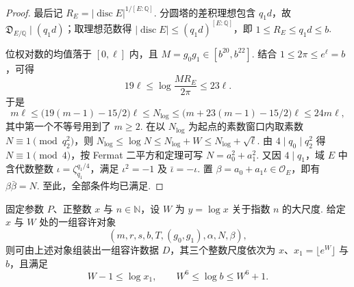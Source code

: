 \begin{proof}
最后记 $R_E=|\operatorname{disc}E|^{1/[E:\mathbb Q]}$. 分圆塔的差积理想包含 $q_1d$，故
$\mathfrak D_{E/\mathbb Q}\mid(q_1d)$；取理想范数得 $|\operatorname{disc}E|\le(q_1d)^{[E:\mathbb Q]}$，即 $1\le R_E\le q_1d\le b$.

位权对数的均值落于 $[0,\ell]$ 内，且 $M=g_0g_1\in[b^{20},b^{22}]$. 结合 $1\le2\pi\le e^\ell=b$，可得
\[
 19\ell\le\log\frac{MR_E}{2\pi}\le23\ell .
\]
于是
\[
 m\ell\le \bigl(19(m-1)-15/2\bigr)\ell
 \le N_{\log}
 \le \bigl(m+23(m-1)-15/2\bigr)\ell\le24m\ell ,
\]
其中第一个不等号用到了 $m\ge2$. 在以 $N_{\log}$ 为起点的素数窗口内取素数 $N\equiv1\pmod{q_2^2}$，则
$N_{\log}\le\log N\le N_{\log}+W\le N_{\log}+\sqrt \ell$.
由 $4\mid q_0\mid q_2^2$ 得 $N\equiv1\pmod4$，按 Fermat 二平方和定理可写
$N=a_0^2+a_1^2$. 又因 $4\mid q_1$，域 $E$ 中含代数整数 $\iota=\zeta_{q_1}^{q_1/4}$，满足 $\iota^2=-1$ 及 $\bar\iota=-\iota$. 置 $\beta=a_0+a_1\iota\in\mathcal O_E$，即有 $\beta\bar\beta=N$. 至此，全部条件均已满足.
\end{proof}

\begin{lemma}[由容许对象构造容许数据]
\label{lem:admissible-fields}
\emitthmsource
固定参数 $P$、正整数 $x$ 与 $n\in\mathbb N$，设 $W$ 为 $y=\log x$ 关于指数 $n$ 的大尺度. 给定 $x$ 与 $W$ 处的一组容许对象
\[
 (m,r,s,b,T,(g_0,g_1),\alpha,N,\beta),
\]
则可由上述对象组装出一组容许数据 $D$，其三个整数尺度依次为 $x$、$x_1=\lfloor e^W\rfloor$ 与 $b$，且满足
\[
 W-1\le\log x_1,\qquad W^6\le\log b\le W^6+1 .
\]
\end{lemma}

